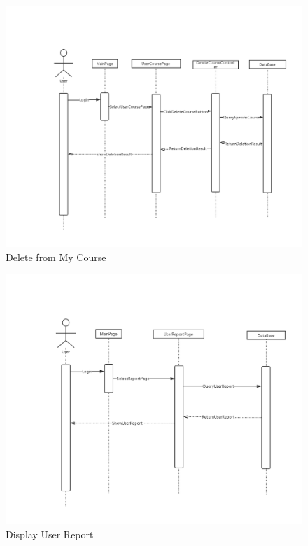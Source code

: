 \documentclass[16pt]{scrreprt}
\begin{document}
\begin{figure}[H]
    \includegraphics[width=\linewidth]{./FuncPhoto/11.png}   
    \caption{Delete from My Course}
\end{figure}

\begin{figure}[H]
    \includegraphics[width=\linewidth]{./FuncPhoto/12.png}   
    \caption{Display User Report}
\end{figure}
\end{document}
